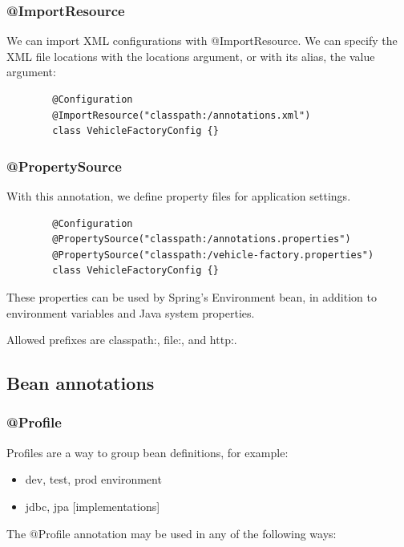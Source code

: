 \documentclass{scrartcl}
\begin{document}
\subsubsection{@ImportResource}

    We can import XML configurations with @ImportResource. We can specify the XML file locations with the locations argument, or with its alias, the value argument:

    \begin{lstlisting}
        @Configuration
        @ImportResource("classpath:/annotations.xml")
        class VehicleFactoryConfig {}
    \end{lstlisting}

\subsubsection{@PropertySource}

    With this annotation, we define property files for application settings.

    \begin{lstlisting}
        @Configuration
        @PropertySource("classpath:/annotations.properties")
        @PropertySource("classpath:/vehicle-factory.properties")
        class VehicleFactoryConfig {}
    \end{lstlisting}

    These properties can be used by Spring's Environment bean, in addition to environment variables and Java system properties.

    Allowed prefixes are classpath:, file:, and http:.

\subsection{Bean annotations}

\subsubsection{@Profile}

    Profiles are a way to group bean definitions, for example:

     \begin{itemize}
        \item dev, test, prod environment
        \item jdbc, jpa [implementations]
    \end{itemize}

   The @Profile annotation may be used in any of the following ways:
\end{document}
